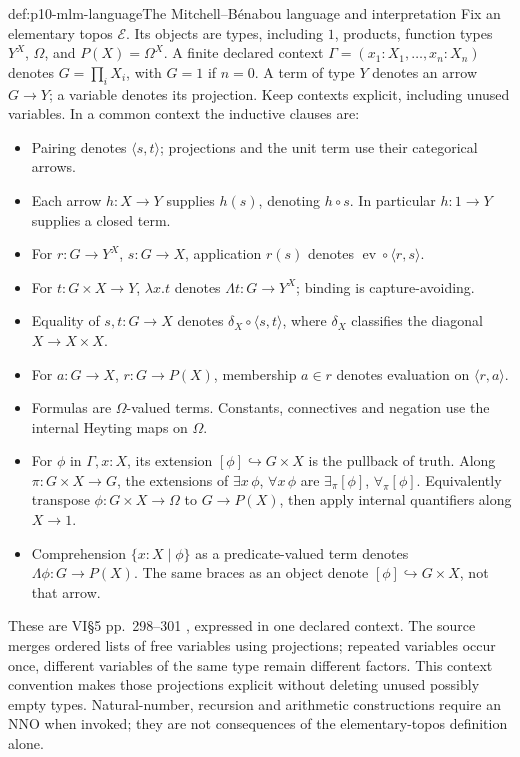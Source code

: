 \begin{hbdefinition}{def:p10-mlm-language}{The Mitchell--B\'enabou language and interpretation}
Fix an elementary topos \(\mathcal E\). Its objects are types, including
\(1\), products, function types \(Y^X\), \(\Omega\), and \(P(X)=\Omega^X\).
A finite declared context \(\Gamma=(x_1:X_1,\ldots,x_n:X_n)\) denotes
\(G=\prod_iX_i\), with \(G=1\) if \(n=0\). A term of type \(Y\) denotes an
arrow \(G\to Y\); a variable denotes its projection. Keep contexts explicit,
including unused variables. In a common context the inductive clauses are:
\begin{itemize}
\item Pairing denotes \(\langle s,t\rangle\); projections and the unit term
      use their categorical arrows.
\item Each arrow \(h:X\to Y\) supplies \(h(s)\), denoting \(h\circ s\).
      In particular \(h:1\to Y\) supplies a closed term.
\item For \(r:G\to Y^X\), \(s:G\to X\), application \(r(s)\) denotes
      \(\operatorname{ev}\circ\langle r,s\rangle\).
\item For \(t:G\times X\to Y\), \(\lambda x.t\) denotes
      \(\Lambda t:G\to Y^X\); binding is capture-avoiding.
\item Equality of \(s,t:G\to X\) denotes
      \(\delta_X\circ\langle s,t\rangle\), where \(\delta_X\) classifies
      the diagonal \(X\to X\times X\).
\item For \(a:G\to X\), \(r:G\to P(X)\), membership \(a\in r\) denotes
      evaluation on \(\langle r,a\rangle\).
\item Formulas are \(\Omega\)-valued terms. Constants, connectives and
      negation use the internal Heyting maps on \(\Omega\).
\item For \(\phi\) in \(\Gamma,x:X\), its extension \([\phi]\hookrightarrow
      G\times X\) is the pullback of truth. Along \(\pi:G\times X\to G\),
      the extensions of \(\exists x\,\phi\), \(\forall x\,\phi\) are
      \(\exists_\pi[\phi]\), \(\forall_\pi[\phi]\). Equivalently transpose
      \(\phi:G\times X\to\Omega\) to \(G\to P(X)\), then apply internal
      quantifiers along \(X\to1\).
\item Comprehension \(\{x:X\mid\phi\}\) as a predicate-valued term denotes
      \(\Lambda\phi:G\to P(X)\). The same braces as an object denote
      \([\phi]\hookrightarrow G\times X\), not that arrow.
\end{itemize}
These are VI\S5 pp.~298--301 \cite{MacLaneMoerdijk1992}, expressed in one
declared context. The source merges ordered lists of free variables using
projections; repeated variables occur once, different variables of the same
type remain different factors. This context convention makes those
projections explicit without deleting unused possibly empty types.
Natural-number, recursion and arithmetic constructions require an NNO when
invoked; they are not consequences of the elementary-topos definition alone.
\end{hbdefinition}


